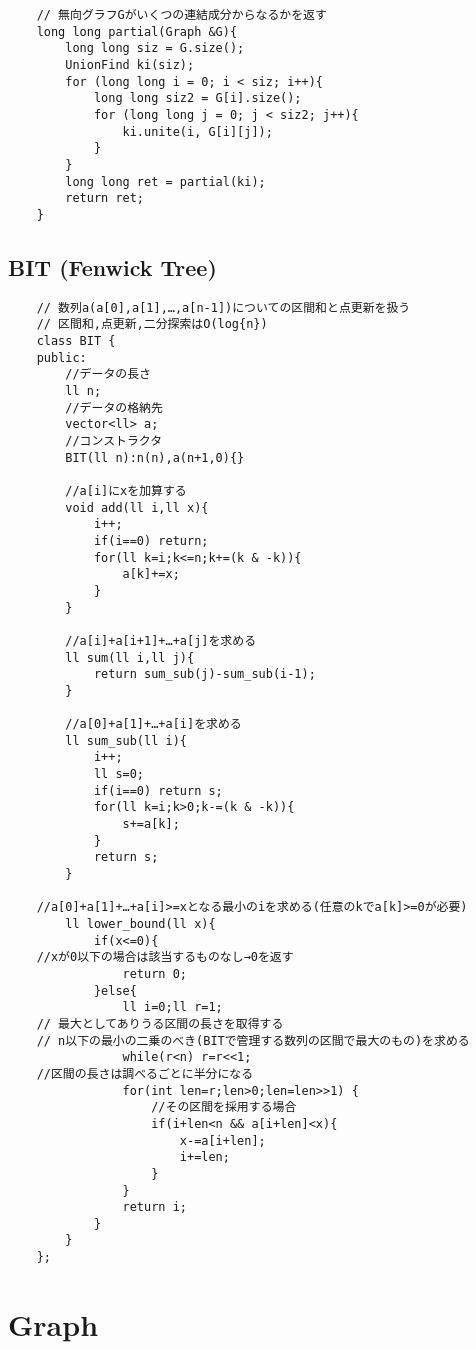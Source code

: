 \documentclass[a4paper, landscape, 9pt]{jarticle} %
\begin{document}
\begin{multicols*}{3}
\begin{lstlisting}
    // 無向グラフGがいくつの連結成分からなるかを返す
    long long partial(Graph &G){
        long long siz = G.size();
        UnionFind ki(siz);
        for (long long i = 0; i < siz; i++){
            long long siz2 = G[i].size();
            for (long long j = 0; j < siz2; j++){
                ki.unite(i, G[i][j]);
            }
        }
        long long ret = partial(ki);
        return ret;
    }
    \end{lstlisting}

    \subsection{BIT  (Fenwick Tree)}
    \begin{lstlisting}
    // 数列a(a[0],a[1],…,a[n-1])についての区間和と点更新を扱う
    // 区間和,点更新,二分探索はO(log{n})
    class BIT {
    public:
        //データの長さ
        ll n;
        //データの格納先
        vector<ll> a;
        //コンストラクタ
        BIT(ll n):n(n),a(n+1,0){}
    
        //a[i]にxを加算する
        void add(ll i,ll x){
            i++;
            if(i==0) return;
            for(ll k=i;k<=n;k+=(k & -k)){
                a[k]+=x;
            }
        }
    
        //a[i]+a[i+1]+…+a[j]を求める
        ll sum(ll i,ll j){
            return sum_sub(j)-sum_sub(i-1);
        }
    
        //a[0]+a[1]+…+a[i]を求める
        ll sum_sub(ll i){
            i++;
            ll s=0;
            if(i==0) return s;
            for(ll k=i;k>0;k-=(k & -k)){
                s+=a[k];
            }
            return s;
        }
    
    //a[0]+a[1]+…+a[i]>=xとなる最小のiを求める(任意のkでa[k]>=0が必要)
        ll lower_bound(ll x){
            if(x<=0){
    //xが0以下の場合は該当するものなし→0を返す
                return 0;
            }else{
                ll i=0;ll r=1;
    // 最大としてありうる区間の長さを取得する
    // n以下の最小の二乗のべき(BITで管理する数列の区間で最大のもの)を求める
                while(r<n) r=r<<1;
    //区間の長さは調べるごとに半分になる
                for(int len=r;len>0;len=len>>1) {
                    //その区間を採用する場合
                    if(i+len<n && a[i+len]<x){
                        x-=a[i+len];
                        i+=len;
                    }
                }
                return i;
            }
        }
    };
    \end{lstlisting}
    \section{Graph}


\end{multicols*}
\end{document}
